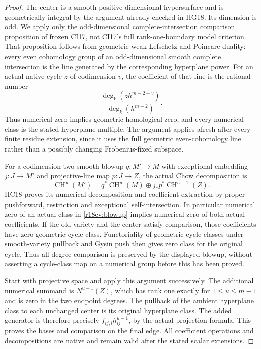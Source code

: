 \begin{proof}
The center is a smooth positive-dimensional hypersurface and
is geometrically integral by the argument already checked in
HG18.  Its dimension is odd.  We apply only the
odd-dimensional complete-intersection comparison proposition
of frozen CI17, not CI17's full rank-one-boundary model
criterion.  That proposition follows from geometric weak
Lefschetz and Poincare duality: every even cohomology group
of an odd-dimensional smooth complete intersection is the
line generated by the corresponding hyperplane power.
For an actual native cycle $z$ of codimension $v$, the
coefficient of that line is the rational number
\[
      \frac{\deg_k(z h^{m-2-v})}{\deg_k(h^{m-2})}.
 \tag{EV18.6}\label{r18ev:rational-coefficient}
\]
Thus numerical zero implies geometric homological zero, and
every numerical class is the stated hyperplane multiple.
The argument applies afresh after every finite residue extension,
since it uses the full geometric even-cohomology line rather
than a possibly changing Frobenius-fixed subspace.

For a codimension-two smooth blowup $q:M'\to M$ with
exceptional embedding $j:J\to M'$ and projective-line map
$p:J\to Z$, the actual Chow decomposition is
\[
       \operatorname{CH}^u(M')
           =q^*\operatorname{CH}^u(M)
                    \oplus j_*p^*\operatorname{CH}^{u-1}(Z).
 \tag{EV18.7}\label{r18ev:blowup}
\]
HC18 proves its numerical decomposition and coefficient
extraction by proper pushforward, restriction and exceptional
self-intersection.  In particular numerical zero of an
actual class in \eqref{r18ev:blowup} implies numerical zero
of both actual coefficients.
If the old variety and the center satisfy comparison, those
coefficients have zero geometric cycle class.  Functoriality
of geometric cycle classes under smooth-variety pullback
and Gysin push then gives zero class for the original cycle.
Thus all-degree comparison is preserved by the displayed
blowup, without asserting a cycle-class map on a numerical
group before this has been proved.

Start with projective space and apply this argument successively.
The additional numerical summand is $N^{u-1}(Z)$, which has
rank one exactly for $1\le u\le m-1$ and is zero in the two
endpoint degrees.  The pullback of the ambient hyperplane
class to each unchanged center is its original hyperplane
class.  The added generator is therefore precisely
$f_{ij,l}h_{ij}^{u-1}$, by the actual projection formula.
This proves the bases and comparison on the final edge.
All coefficient operations and decompositions are native
and remain valid after the stated scalar extensions.
\end{proof}


